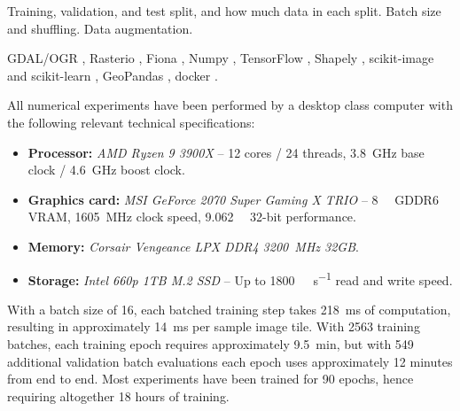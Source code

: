 
Training, validation, and test split, and how much data in each split.
Batch size and shuffling.
Data augmentation.


GDAL/OGR \cite{dep:gdal}, Rasterio \cite{dep:rasterio}, Fiona \cite{dep:fiona}, Numpy \cite{dep:numpy}, TensorFlow \cite{dep:tensorflow}, Shapely \cite{dep:shapely}, scikit-image \cite{dep:scikit-image} and scikit-learn \cite{dep:sklearn}, GeoPandas \cite{dep:geopandas}, docker \cite{dep:docker}.


All numerical experiments have been performed by a desktop class computer with the following relevant technical specifications:

\begin{itemize}
  \item \textbf{Processor:} \textit{AMD Ryzen 9 3900X} -- 12 cores / 24 threads, \SI{3.8}{\giga\hertz} base clock / \SI{4.6}{\giga\hertz} boost clock.
  \item \textbf{Graphics card:} \textit{MSI GeForce 2070 Super Gaming X TRIO} -- \SI{8}{\giga\byte} GDDR6 VRAM, \SI{1605}{\mega\hertz} clock speed, \SI{9.062}{\tera\flops} 32-bit performance.
  \item \textbf{Memory:} \textit{Corsair Vengeance LPX DDR4 \SI{3200}{\mega\hertz} 32GB}.
  \item \textbf{Storage:} \textit{Intel 660p 1TB M.2 SSD} -- Up to \SI{1800}{\mega\byte\per\second} read and write speed.
\end{itemize}

With a batch size of 16, each batched training step takes \SI{218}{\milli\second} of computation, resulting in approximately \SI{14}{\milli\second} per sample image tile.
With \num{2563} training batches, each training epoch requires approximately \SI{9.5}{\minute}, but with \num{549} additional validation batch evaluations each epoch uses approximately 12 minutes from end to end.
Most experiments have been trained for 90 epochs, hence requiring altogether 18 hours of training.
